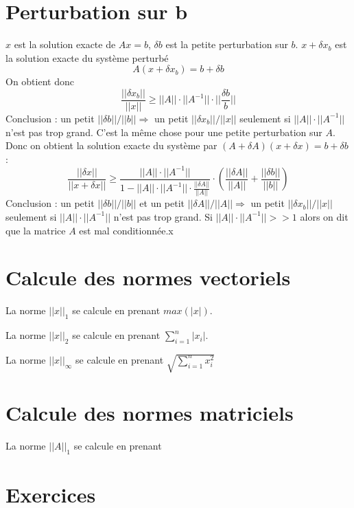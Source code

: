 \documentclass[a4paper,9pt]{extarticle}
\newcommand{\vecnorm}[1]{||#1||}
\newcommand{\normun}[1]{||#1||_1}
\newcommand{\normdeux}[1]{||#1||_2}
\newcommand{\norminf}[1]{||#1||_{\infty}}
\begin{document}
\section{Perturbation sur b}

$x$ est la solution exacte de $Ax=b$, $\delta b$ est la petite perturbation sur $b$. $x + \delta x_b$ est la solution exacte du système perturbé
$$
A(x+\delta x_b) = b + \delta b
$$
On obtient donc
$$
\frac{\vecnorm{\delta x_b}}{\vecnorm{x}} \geq \vecnorm{A}\cdot \vecnorm{A^{-1}}\cdot\vecnorm{\frac{\delta b}{b}}
$$
Conclusion : un petit $\vecnorm{\delta b} / \vecnorm{b} \Rightarrow$ un petit $\vecnorm{\delta x_b}/\vecnorm{x}$ seulement si $\vecnorm{A}\cdot \vecnorm{A^{-1}}$ n'est pas trop grand. C'est la même chose pour une petite perturbation sur $A$. Donc on obtient la solution exacte du système par $(A + \delta A)(x + \delta x) = b + \delta b$ :
$$
\frac{\vecnorm{\delta x}}{\vecnorm{x + \delta x}} \geq \frac{\vecnorm{A}\cdot\vecnorm{A^{-1}}}{1-\vecnorm{A}\cdot\vecnorm{A^{-1}}\cdot\frac{\vecnorm{\delta A}}{\vecnorm{A}}} \cdot (\frac{\vecnorm{\delta A}}{\vecnorm{A}} + \frac{\vecnorm{\delta b}}{\vecnorm{b}})
$$
Conclusion : un petit $\vecnorm{\delta b} / \vecnorm{b}$ et un petit $\vecnorm{\delta A} / \vecnorm{A} \Rightarrow$ un petit $\vecnorm{\delta x_b}/\vecnorm{x}$ seulement si $\vecnorm{A}\cdot \vecnorm{A^{-1}}$ n'est pas trop grand. Si $\vecnorm{A}\cdot \vecnorm{A^{-1}} >> 1$ alors on dit que la matrice $A$ est mal conditionnée.x

\section{Calcule des normes vectoriels}

La norme $\normun{x}$ se calcule en prenant $max(|x|)$.

La norme $\normdeux{x}$ se calcule en prenant $\sum_{i=1}^n |x_i|$.

La norme $\norminf{x}$ se calcule en prenant $\sqrt{\sum_{i=1}^n x_i^2}$

\section{Calcule des normes matriciels}



La norme $\normun{A}$ se calcule en prenant 

\section{Exercices}
\end{document}
